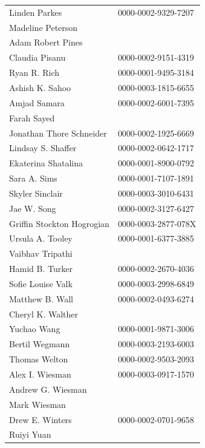 \documentclass[fleqn,10pt,inline]{wlscirep}
\begin{document}
\begin{appendixbox}
\begin{longtable}{ll}
             Linden Parkes & 0000-0002-9329-7207 \\
         Madeline Peterson &                     \\
         Adam Robert Pines &                     \\
            Claudia Pisanu & 0000-0002-9151-4319 \\
              Ryan R. Rich & 0000-0001-9495-3184 \\
           Ashish K. Sahoo & 0000-0003-1815-6655 \\
              Amjad Samara & 0000-0002-6001-7395 \\
               Farah Sayed &                     \\
  Jonathan Thore Schneider & 0000-0002-1925-6669 \\
        Lindsay S. Shaffer & 0000-0002-0642-1717 \\
       Ekaterina Shatalina & 0000-0001-8900-0792 \\
              Sara A. Sims & 0000-0001-7107-1891 \\
           Skyler Sinclair & 0000-0003-3010-6431 \\
               Jae W. Song & 0000-0002-3127-6427 \\
Griffin Stockton Hogrogian & 0000-0003-2877-078X \\
          Ursula A. Tooley & 0000-0001-6377-3885 \\
          Vaibhav Tripathi &                     \\
           Hamid B. Turker & 0000-0002-2670-4036 \\
         Sofie Louise Valk & 0000-0003-2998-6849 \\
           Matthew B. Wall & 0000-0002-0493-6274 \\
         Cheryl K. Walther &                     \\
               Yuchao Wang & 0000-0001-9871-3006 \\
            Bertil Wegmann & 0000-0003-2193-6003 \\
             Thomas Welton & 0000-0002-9503-2093 \\
           Alex I. Wiesman & 0000-0003-0917-1570 \\
         Andrew G. Wiesman &                     \\
              Mark Wiesman &                     \\
           Drew E. Winters & 0000-0002-0701-9658 \\
                Ruiyi Yuan &                     \\

\end{longtable}
\end{appendixbox}
\end{document}

